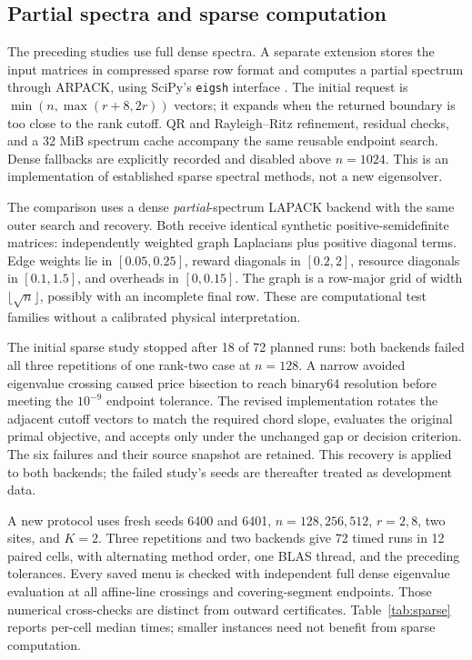 \subsection{Partial spectra and sparse computation}\label{sec:sparse}
The preceding studies use full dense spectra. A separate extension stores
the input matrices in compressed sparse row format and computes a partial
spectrum through ARPACK, using SciPy's \texttt{eigsh} interface
\cite{scipyeigsh}. The initial request is $\min(n,\max(r+8,2r))$ vectors;
it expands when the returned boundary is too close to the rank cutoff.
QR and Rayleigh--Ritz refinement, residual checks, and a 32 MiB spectrum
cache accompany the same reusable endpoint search. Dense fallbacks are
explicitly recorded and disabled above $n=1024$. This is an implementation
of established sparse spectral methods, not a new eigensolver.

The comparison uses a dense \emph{partial}-spectrum LAPACK backend with
the same outer search and recovery. Both receive identical synthetic
positive-semidefinite matrices: independently weighted graph Laplacians
plus positive diagonal terms. Edge weights lie in $[0.05,0.25]$, reward
diagonals in $[0.2,2]$, resource diagonals in $[0.1,1.5]$, and overheads in
$[0,0.15]$. The graph is a row-major grid of width $\lfloor\sqrt n\rfloor$,
possibly with an incomplete final row. These are computational test
families without a calibrated physical interpretation.

The initial sparse study stopped after 18 of 72 planned runs: both backends
failed all three repetitions of one rank-two case at $n=128$. A narrow
avoided eigenvalue crossing caused price bisection to reach binary64
resolution before meeting the $10^{-9}$ endpoint tolerance. The revised
implementation rotates the adjacent cutoff vectors to match the required
chord slope, evaluates the original primal objective, and accepts only
under the unchanged gap or decision criterion. The six failures and their
source snapshot are retained. This recovery is applied to both backends;
the failed study's seeds are thereafter treated as development data.

A new protocol uses fresh seeds 6400 and 6401, $n=128,256,512$,
$r=2,8$, two sites, and $K=2$. Three repetitions and two backends give
72 timed runs in 12 paired cells, with alternating method order, one BLAS
thread, and the preceding tolerances. Every saved menu is checked with
independent full dense eigenvalue evaluation at all affine-line crossings
and covering-segment endpoints. Those numerical cross-checks are distinct
from outward certificates. Table~\ref{tab:sparse} reports per-cell median
times; smaller instances need not benefit from sparse computation.

